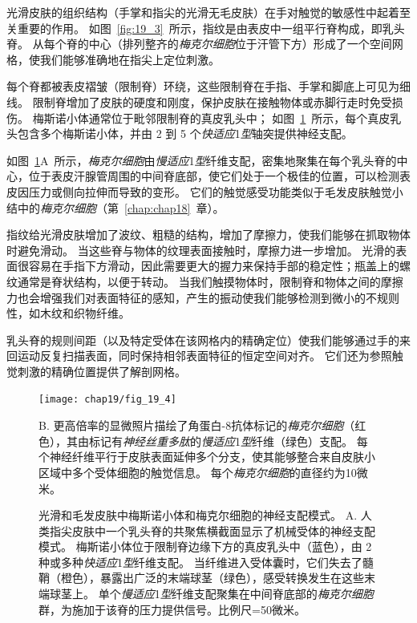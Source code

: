 \begin{proposition}[指纹结构提高了手部的触觉敏感性] \label{box:19_1}
	
	\quad \quad 光滑皮肤的组织结构（手掌和指尖的光滑无毛皮肤）在手对触觉的敏感性中起着至关重要的作用。
	如图~\ref{fig:19_3}~所示，指纹是由表皮中一组平行脊构成，即乳头脊。
	从每个脊的中心（排列整齐的\textit{梅克尔细胞}位于汗管下方）形成了一个空间网格，使我们能够准确地在指尖上定位刺激。
	
	\quad \quad 每个脊都被表皮褶皱（限制脊）环绕，这些限制脊在手指、手掌和脚底上可见为细线。
	限制脊增加了皮肤的硬度和刚度，保护皮肤在接触物体或赤脚行走时免受损伤。
	梅斯诺小体通常位于毗邻限制脊的真皮乳头中；
	如图~\ref{fig:19_4}~所示，每个真皮乳头包含多个梅斯诺小体，并由 2 到 5 个\textit{快适应}1\textit{型}轴突提供神经支配。
	
	\quad \quad 如图~\ref{fig:19_4}A~所示，\textit{梅克尔细胞}由\textit{慢适应}1\textit{型}纤维支配，密集地聚集在每个乳头脊的中心，位于表皮汗腺管周围的中间脊底部，使它们处于一个极佳的位置，可以检测表皮因压力或侧向拉伸而导致的变形。
	它们的触觉感受功能类似于毛发皮肤触觉小结中的\textit{梅克尔细胞}（第~\ref{chap:chap18}~章）。
	
	\quad \quad 指纹给光滑皮肤增加了波纹、粗糙的结构，增加了摩擦力，使我们能够在抓取物体时避免滑动。
	当这些脊与物体的纹理表面接触时，摩擦力进一步增加。
	光滑的表面很容易在手指下方滑动，因此需要更大的握力来保持手部的稳定性；瓶盖上的螺纹通常是脊状结构，以便于转动。
	当我们触摸物体时，限制脊和物体之间的摩擦力也会增强我们对表面特征的感知，产生的振动使我们能够检测到微小的不规则性，如木纹和织物纤维。
	
	\quad \quad 乳头脊的规则间距（以及特定受体在该网格内的精确定位）使我们能够通过手的来回运动反复扫描表面，同时保持相邻表面特征的恒定空间对齐。
	它们还为参照触觉刺激的精确位置提供了解剖网格。
	
\end{proposition}


\begin{figure}[htbp]
	\centering
	\texttt{[image: chap19/fig\_19\_4]}
	\caption{光滑和毛发皮肤中梅斯诺小体和梅克尔细胞的神经支配模式。
		A. 人类指尖皮肤中一个乳头脊的共聚焦横截面显示了机械受体的神经支配模式。
		梅斯诺小体位于限制脊边缘下方的真皮乳头中（蓝色），由 2 种或多种\textit{快适应}1\textit{型}纤维支配。
		当纤维进入受体囊时，它们失去了髓鞘（橙色），暴露出广泛的末端球茎（绿色），感受转换发生在这些末端球茎上。
		单个\textit{慢适应}1\textit{型}纤维支配聚集在中间脊底部的\textit{梅克尔细胞}群，为施加于该脊的压力提供信号。比例尺=50微米。}
		B. 更高倍率的显微照片描绘了角蛋白-8抗体标记的\textit{梅克尔细胞}（红色），其由标记有\textit{神经丝重多肽}的\textit{慢适应}1\textit{型}纤维（绿色）支配。
		每个神经纤维平行于皮肤表面延伸多个分支，使其能够整合来自皮肤小区域中多个受体细胞的触觉信息。
		每个\textit{梅克尔细胞}的直径约为10微米。
	\label{fig:19_4}
\end{figure}


